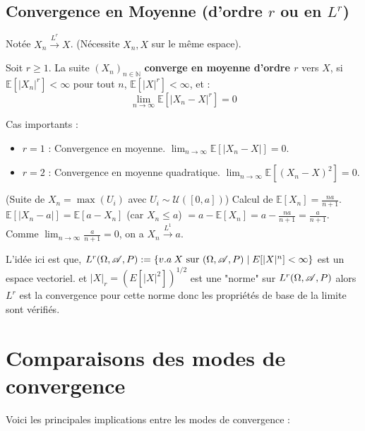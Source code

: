 \subsection {Convergence en Moyenne (d'ordre $r$ ou en $L^r$)}

Notée $X_n \xrightarrow{L^r} X$. (Nécessite $X_n, X$ sur le même espace).

\begin{definition}
Soit $r \ge 1$. La suite $(X_n)_{n \in \mathbb{N}}$ \textbf{converge en moyenne d'ordre $r$} vers $X$, si $\mathbb{E}[|X_n|^r] < \infty$ pour tout $n$, $\mathbb{E}[|X|^r] < \infty$, et :
$$\lim_{n \to \infty} \mathbb{E}[|X_n - X|^r] = 0$$
\end{definition}

Cas importants :
\begin{itemize}
    \item $r = 1$ : Convergence en moyenne. $\lim_{n \to \infty} \mathbb{E}[|X_n - X|] = 0$.
    \item $r = 2$ : Convergence en moyenne quadratique. $\lim_{n \to \infty} \mathbb{E}[(X_n - X)^2] = 0$.
\end{itemize}

\begin{exemple}(Suite de $X_n = \max(U_i)$ avec $U_i \sim \mathcal{U}([0, a])$)
Calcul de $\mathbb{E}[X_n] = \frac{na}{n+1}$. $\mathbb{E}[|X_n - a|] = \mathbb{E}[a - X_n]$ (car $X_n \le a$) $= a - \mathbb{E}[X_n] = a - \frac{na}{n+1} = \frac{a}{n+1}$. Comme $\lim_{n \to \infty} \frac{a}{n+1} = 0$, on a $X_n \xrightarrow{L^1} a$.
\end{exemple}

L'idée ici est que, $L^r(\Omega,\mathscr{A}, P):= \{v.a \: X \text{ sur } (\Omega,\mathscr{A}, P)\mid E[|X|^n]<\infty\}$ est un espace vectoriel.
et $|X|_r= (E[|X|^2])^{1/2}$ est une "norme" sur $L^r(\Omega,\mathscr{A}, P)$ alors $L^r$ est la convergence pour cette norme donc les propriétés de base de la limite sont vérifiés.
\section{Comparaisons des modes de convergence}

Voici les principales implications entre les modes de convergence :

